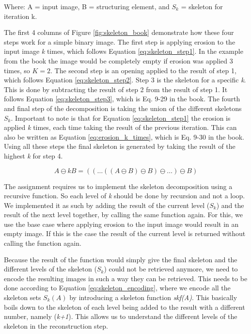 \documentclass{article}
\begin{document}
Where: A = input image, B = structuring element, and $S_k$ = skeleton for iteration k.

The first 4 columns of Figure \ref{fig:skeleton_book} demonstrate how these four steps work for a simple binary image. The first step is applying erosion to the input image \textit{k} times, which follows Equation \ref{eq:skeleton_step1}. In the example from the book the image would be completely empty if erosion was applied 3 times, so $K=2$. The second step is an opening applied to the result of step 1, which follows Equation \ref{eq:skeleton_step2}. Step 3 is the skeleton for a specific \textit{k}. This is done by subtracting the result of step 2 from the result of step 1. It follows Equation \ref{eq:skeleton_step3}, which is Eq. 9-29 in the book. The fourth and final step of the decomposition is taking the union of the different skeletons $S_k$. Important to note is that for Equation \ref{eq:skeleton_step1} the erosion is applied \textit{k} times, each time taking the result of the previous iteration. This can also be written as Equation \ref{eq:erosion_k_times}, which is Eq. 9-30 in the book. Using all these steps the final skeleton is generated by taking the result of the highest \textit{k} for step 4.

\begin{equation}\label{eq:erosion_k_times}
    A \ominus k B = ((\dots((A \ominus B) \ominus B) \ominus \dots) \ominus B)
\end{equation}

The assignment requires us to implement the skeleton decomposition using a recursive function. So each level of \textit{k} should be done by recursion and not a loop. We implemented it as such by adding the result of the current level ($S_k$) and the result of the next level together, by calling the same function again. For this, we use the base case where applying erosion to the input image would result in an empty image. If this is the case the result of the current level is returned without calling the function again.

Because the result of the function would simply give the final skeleton and the different levels of the skeleton ($S_k$) could not be retrieved anymore, we need to encode the resulting images in such a way they can be retrieved. This needs to be done according to Equation \ref{eq:skeleton_encoding}, where we encode all the skeleton sets $S_k(A)$ by introducing a skeleton function \textit{skf(A)}. This basically boils down to the skeleton of each level being added to the result with a different number, namely (\textit{k+1}). This allows us to understand the different levels of the skeleton in the reconstruction step.
\end{document}
